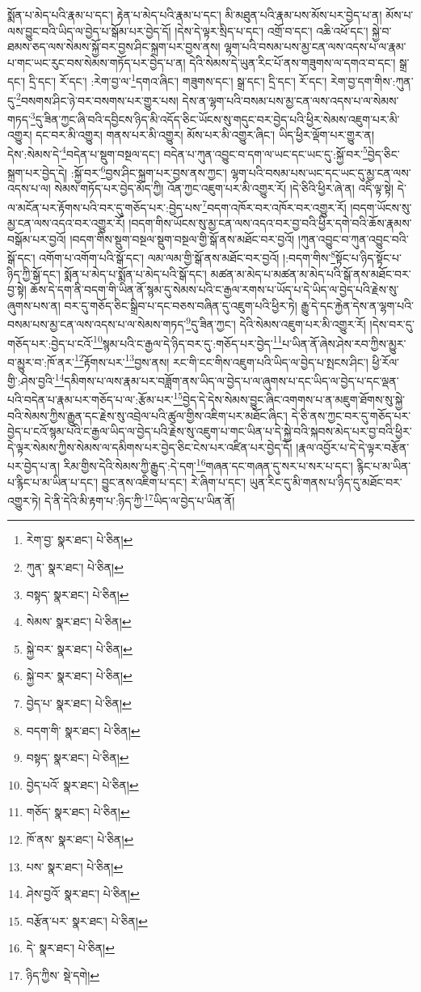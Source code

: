 སྨོན་པ་མེད་པའི་རྣམ་པ་དང་། རྟེན་པ་མེད་པའི་རྣམ་པ་དང་། མི་མཐུན་པའི་རྣམ་པས་མོས་པར་བྱེད་པ་ན། མོས་པ་ལས་བྱུང་བའི་ཡིད་ལ་བྱེད་པ་སྒོམ་པར་བྱེད་དོ། །དེས་དེ་ལྟར་སྲིད་པ་དང་། འགྲོ་བ་དང་། འཆི་འཕོ་དང་། སྐྱེ་བ་ཐམས་ཅད་ལས་སེམས་སྐྱོ་བར་བྱས་ཤིང་སྐྲག་པར་བྱས་ནས། ལྷག་པའི་བསམ་པས་མྱ་ངན་ལས་འདས་པ་ལ་རྣམ་པ་གང་ཡང་རུང་བས་སེམས་གཏོད་པར་བྱེད་པ་ན། དེའི་སེམས་དེ་ཡུན་རིང་པོ་ནས་གཟུགས་ལ་དགའ་བ་དང་། སྒྲ་དང་། དྲི་དང་། རོ་དང་། :རེག་བྱ་ལ་\footnote{རེག་བྱ་  སྣར་ཐང་།  པེ་ཅིན། }དགའ་ཞིང་། གཟུགས་དང་། སྒྲ་དང་། དྲི་དང་། རོ་དང་། རེག་བྱ་དག་གིས་:ཀུན་དུ་\footnote{ཀུན་  སྣར་ཐང་།  པེ་ཅིན། }བསགས་ཤིང་ཉེ་བར་བསགས་པར་གྱུར་པས། དེས་ན་ལྷག་པའི་བསམ་པས་མྱ་ངན་ལས་འདས་པ་ལ་སེམས་གཏད་\footnote{བསྟད་  སྣར་ཐང་།  པེ་ཅིན། }དུ་ཟིན་ཀྱང་ཞི་བའི་དབྱིངས་ཉིད་མི་འདོད་ཅིང་ཡོངས་སུ་གདུང་བར་བྱེད་པའི་ཕྱིར་སེམས་འཇུག་པར་མི་འགྱུར། དང་བར་མི་འགྱུར། གནས་པར་མི་འགྱུར། མོས་པར་མི་འགྱུར་ཞིང་། ཡིད་ཕྱིར་ལྡོག་པར་གྱུར་ན། དེས་:སེམས་དེ་\footnote{སེམས་  སྣར་ཐང་།  པེ་ཅིན། }བདེན་པ་སྡུག་བསྔལ་དང་། བདེན་པ་ཀུན་འབྱུང་བ་དག་ལ་ཡང་དང་ཡང་དུ་:སྐྱོ་བར་\footnote{སྐྱེ་བར་  སྣར་ཐང་།  པེ་ཅིན། }བྱེད་ཅིང་སྐྲག་པར་བྱེད་དེ། :སྐྱོ་བར་\footnote{སྐྱེ་བར་  སྣར་ཐང་།  པེ་ཅིན། }བྱས་ཤིང་སྐྲག་པར་བྱས་ནས་ཀྱང་། ལྷག་པའི་བསམ་པས་ཡང་དང་ཡང་དུ་མྱ་ངན་ལས་འདས་པ་ལ། སེམས་གཏོད་པར་བྱེད་མོད་ཀྱི། འོན་ཀྱང་འཇུག་པར་མི་འགྱུར་རོ། །དེ་ཅིའི་ཕྱིར་ཞེ་ན། འདི་ལྟ་སྟེ། དེ་ལ་མངོན་པར་རྟོགས་པའི་བར་དུ་གཅོད་པར་:བྱེད་པས་\footnote{བྱེད་པ་  སྣར་ཐང་།  པེ་ཅིན། }བདག་འཁོར་བར་འཁོར་བར་འགྱུར་རོ། །བདག་ཡོངས་སུ་མྱ་ངན་ལས་འདའ་བར་འགྱུར་རོ། །བདག་གིས་ཡོངས་སུ་མྱ་ངན་ལས་འདའ་བར་བྱ་བའི་ཕྱིར་དགེ་བའི་ཆོས་རྣམས་བསྒོམ་པར་བྱའོ། །བདག་གིས་སྡུག་བསྔལ་སྡུག་བསྔལ་གྱི་སྒོ་ནས་མཐོང་བར་བྱའོ། །ཀུན་འབྱུང་བ་ཀུན་འབྱུང་བའི་སྒོ་དང་། འགོག་པ་འགོག་པའི་སྒོ་དང་། ལམ་ལམ་གྱི་སྒོ་ནས་མཐོང་བར་བྱའོ། །:བདག་གིས་\footnote{བདག་གི་  སྣར་ཐང་།  པེ་ཅིན། }སྟོང་པ་ཉིད་སྟོང་པ་ཉིད་ཀྱི་སྒོ་དང་། སྨོན་པ་མེད་པ་སྨོན་པ་མེད་པའི་སྒོ་དང་། མཚན་མ་མེད་པ་མཚན་མ་མེད་པའི་སྒོ་ནས་མཐོང་བར་བྱ་སྟེ། ཆོས་དེ་དག་ནི་བདག་གི་ཡིན་ནོ་སྙམ་དུ་སེམས་པའི་ང་རྒྱལ་རགས་པ་ཡོད་པ་དེ་ཡིད་ལ་བྱེད་པའི་རྗེས་སུ་ཞུགས་པས་ན། བར་དུ་གཅོད་ཅིང་སྒྲིབ་པ་དང་བཅས་བཞིན་དུ་འཇུག་པའི་ཕྱིར་ཏེ། རྒྱུ་དེ་དང་རྐྱེན་དེས་ན་ལྷག་པའི་བསམ་པས་མྱ་ངན་ལས་འདས་པ་ལ་སེམས་གཏད་\footnote{བསྟད་  སྣར་ཐང་།  པེ་ཅིན། }དུ་ཟིན་ཀྱང་། དེའི་སེམས་འཇུག་པར་མི་འགྱུར་རོ། །དེས་བར་དུ་གཅོད་པར་:བྱེད་པ་ངའོ་\footnote{བྱེད་པའོ་  སྣར་ཐང་།  པེ་ཅིན། }སྙམ་པའི་ང་རྒྱལ་དེ་ཉིད་བར་དུ་:གཅོད་པར་བྱེད་\footnote{གཅོད་  སྣར་ཐང་།  པེ་ཅིན། }པ་ཡིན་ནོ་ཞེས་ཤེས་རབ་ཀྱིས་མྱུར་བ་མྱུར་བ་:ཁོ་ནར་\footnote{ཁོ་ནས་  སྣར་ཐང་།  པེ་ཅིན། }རྟོགས་པར་\footnote{པས་  སྣར་ཐང་།  པེ་ཅིན། }བྱས་ནས། རང་གི་ངང་གིས་འཇུག་པའི་ཡིད་ལ་བྱེད་པ་སྤངས་ཤིང་། ཕྱི་རོལ་གྱི་:ཤེས་བྱའི་\footnote{ཤེས་བྱའོ་  སྣར་ཐང་།  པེ་ཅིན། }དམིགས་པ་ལས་རྣམ་པར་བཟློག་ནས་ཡིད་ལ་བྱེད་པ་ལ་ཞུགས་པ་དང་ཡིད་ལ་བྱེད་པ་དང་ལྡན་པའི་བདེན་པ་རྣམ་པར་གཅོད་པ་ལ་:རྩོམ་པར་\footnote{བརྩོན་པར་  སྣར་ཐང་།  པེ་ཅིན། }བྱེད་དེ་དེས་སེམས་བྱུང་ཞིང་འགགས་པ་ན་མཇུག་ཐོགས་སུ་སྐྱེ་བའི་སེམས་ཀྱིས་རྒྱུན་དང་རྗེས་སུ་འབྲེལ་པའི་ཚུལ་གྱིས་འཇིག་པར་མཐོང་ཞིང་། དེ་ཅི་ནས་ཀྱང་བར་དུ་གཅོད་པར་བྱེད་པ་ངའོ་སྙམ་པའི་ང་རྒྱལ་ཡིད་ལ་བྱེད་པའི་རྗེས་སུ་འཇུག་པ་གང་ཡིན་པ་དེ་སྐྱེ་བའི་སྐབས་མེད་པར་བྱ་བའི་ཕྱིར་དེ་ལྟར་སེམས་ཀྱིས་སེམས་ལ་དམིགས་པར་བྱེད་ཅིང་ངེས་པར་འཛིན་པར་བྱེད་དོ། །རྣལ་འབྱོར་པ་དེ་དེ་ལྟར་བརྩོན་པར་བྱེད་པ་ན། རིམ་གྱིས་དེའི་སེམས་ཀྱི་རྒྱུད་:དེ་དག་\footnote{དེ་  སྣར་ཐང་།  པེ་ཅིན། }གཞན་དང་གཞན་དུ་སར་པ་སར་པ་དང་། རྙིང་པ་མ་ཡིན་པ་རྙིང་པ་མ་ཡིན་པ་དང་། བྱུང་ནས་འཇིག་པ་དང་། རེ་ཞིག་པ་དང་། ཡུན་རིང་དུ་མི་གནས་པ་ཉིད་དུ་མཐོང་བར་འགྱུར་ཏེ། དེ་ནི་དེའི་མི་རྟག་པ་:ཉིད་ཀྱི་\footnote{ཉིད་ཀྱིས་  སྡེ་དགེ། }ཡིད་ལ་བྱེད་པ་ཡིན་ནོ། 